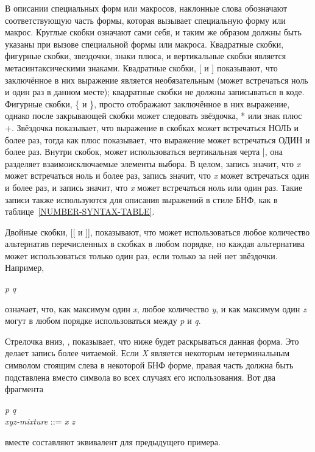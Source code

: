 В описании специальных форм или макросов, наклонные слова обозначают
соответствующую часть формы, которая вызывает специальную форму или макрос.
Круглые скобки означают сами себя, и таким же образом должны быть указаны при
вызове специальной формы или макроса.
Квадратные скобки, фигурные скобки, звездочки, знаки плюса, и вертикальные скобки
является метасинтаксическими знаками.
Квадратные скобки,
[ и ] показывают, что заключённое в них выражение является
необязательным (может встречаться ноль и один раз в данном месте); квадратные
скобки не должны записываться в коде.
Фигурные скобки, \{ и \}, просто отображают заключённое в них
выражение, однако после закрывающей скобки может следовать звёздочка, * или
знак плюс +. Звёздочка показывает, что выражение в скобках может
встречаться НОЛЬ и более раз, тогда как плюс показывает, что выражение может
встречаться ОДИН и более раз. Внутри скобок, может использоваться вертикальная
черта |, она разделяет взаимоисключаемые элементы выбора.
В целом, запись  значит, что \emph{x} может встречаться ноль и
более раз, запись  значит, что \emph{x} может встречаться один и
более раз, и запись  значит, что \emph{x} может встречаться ноль или
один раз. Такие записи также используются для описания выражений в стиле БНФ,
как в таблице~\ref{NUMBER-SYNTAX-TABLE}.

Двойные скобки, [[ и ]], показывают, что может использоваться
любое количество альтернатив перечисленных в скобках в любом порядке, но каждая
альтернатива может использоваться только один раз, если только за ней нет
звёздочки.
Например,
\begin{tabbing}
\emph{p}  \emph{q}
\end{tabbing}
означает, что, как максимум один \emph{x}, любое количество \emph{y}, и как максимум
один \emph{z} могут в любом порядке использоваться между \emph{p} и \emph{q}.

Стрелочка вниз, \Mind{}, показывает, что ниже будет раскрываться данная
форма. Это делает запись \Mchoice{~} более читаемой. Если \emph{X} является
некоторым нетерминальным символом стоящим слева в некоторой БНФ форме, правая
часть должна быть подставлена вместо символа  во всех случаях его
использования. Вот два фрагмента

\begin{tabbing}
\emph{p}  \emph{q} \\
\emph{xyz-mixture} ::= \emph{x\/} {\Mor}  {\Mor} \emph{z\/}
\end{tabbing}
вместе составляют эквивалент для предыдущего примера.

